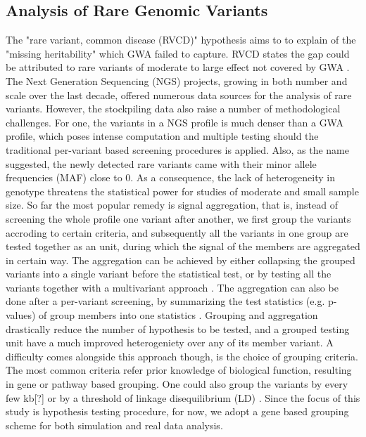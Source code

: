 \subsection{Analysis of Rare Genomic Variants}
The "rare variant, common disease (RVCD)" hypothesis aims to to explain of the "missing heritability" which GWA failed to capture. RVCD states the gap could be attributed to rare variants of moderate to large effect not covered by GWA \cite{RVCD1}. The Next Generation Sequencing (NGS) projects, growing in both number and scale over the last decade, offered numerous data sources for the analysis of rare variants. However, the stockpiling data also raise a number of methodological challenges. For one, the variants in a NGS profile is much denser than a GWA profile, which poses intense computation and multiple testing should the traditional per-variant based screening procedures is applied. Also, as the name suggested, the newly detected rare variants came with their minor allele frequencies (MAF) close to 0. As a consequence, the lack of heterogeneity in genotype threatens the statistical power for studies of moderate and small sample size. So far the most popular remedy is signal aggregation, that is, instead of screening the whole profile one variant after another, we first group the variants accroding to certain criteria, and subsequently all the variants in one group are tested together as an unit, during which the signal of the members are aggregated in certain way. The aggregation can be achieved by either collapsing the grouped variants into a single variant \cite{Burden1} before the statistical test, or by testing all the variants together with a multivariant approach \cite{HWU, SKT}. The aggregation can also be done after a per-variant screening, by summarizing the test statistics (e.g. p-values) of group members into one statistics \cite{Dai:2015, plink1}. Grouping and aggregation drastically reduce the number of hypothesis to be tested, and a grouped testing unit have a much improved heterogeniety over any of its member variant. A difficulty comes alongside this approach though, is the choice of grouping criteria. The most common criteria refer prior knowledge of biological function, resulting in gene or pathway based grouping. One could also group the variants by every few kb[?] or by a threshold of linkage disequilibrium (LD) \cite{plink1}. Since the focus of this study is hypothesis testing procedure, for now, we adopt a gene based grouping scheme for both simulation and real data analysis.

